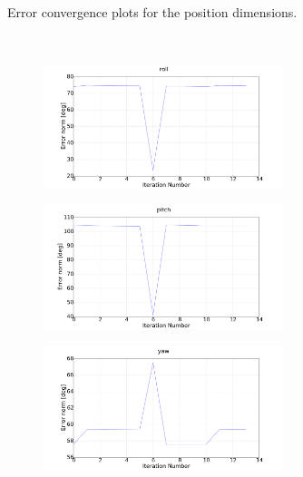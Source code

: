 \begin{figure}
\begin{subfigure}{0.48\textwidth}
\begin{subfigure}{\textwidth}
    \end{subfigure}
    \caption{Error convergence plots for the position dimensions.}
  \end{subfigure}
  ~
  \begin{subfigure}{0.48\textwidth}
    \begin{subfigure}{\textwidth}
      \includegraphics[clip, trim = 100 0 120 0, width=\textwidth]{figures/chapter3/err_roll}
    \end{subfigure}
    \begin{subfigure}{\textwidth}
      \includegraphics[clip, trim = 100 0 120 0, width=\textwidth]{figures/chapter3/err_pitch}
    \end{subfigure}
    \begin{subfigure}{\textwidth}
      \includegraphics[clip, trim = 100 0 120 0, width=\textwidth]{figures/chapter3/err_yaw}

\end{subfigure}
\end{subfigure}
\end{figure}
